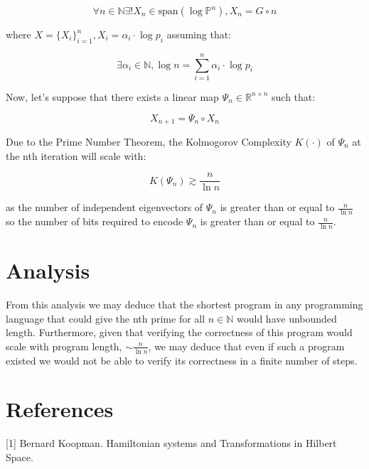 \documentclass{article}
\begin{document}
\begin{equation}
\forall n \in \mathbb{N} \exists! X_n \in \text{span}(\log \mathbb{P}^n), X_n = G \circ n
\end{equation}

where $X = \{X_i\}_{i=1}^n, X_i = \alpha_i \cdot \log p_i$ assuming that:

\begin{equation}
\exists \alpha_i \in \mathbb{N}, \log n = \sum_{i=1}^n \alpha_i \cdot \log p_i
\end{equation}

Now, let's suppose that there exists a linear map $\Psi_n \in \mathbb{R}^{n \times n}$ such that:

\begin{equation}
X_{n+1} = \Psi_n \circ X_n
\end{equation}

Due to the Prime Number Theorem, the Kolmogorov Complexity $K(\cdot)$ of $\Psi_n$ at the nth iteration will scale with:

\begin{equation}
K(\Psi_n) \gtrsim \frac{n}{\ln n}
\end{equation}

as the number of independent eigenvectors of $\Psi_n$ is greater than or equal to $\frac{n}{\ln n}$ so the number of bits required to encode $\Psi_n$ is greater than or equal to $\frac{n}{\ln n}$.

\newpage

\section{Analysis}

From this analysis we may deduce that the shortest program in any programming language that could give the nth prime for all $n \in \mathbb{N}$ would have unbounded length. Furthermore, given that verifying the correctness of this program would scale with program length, $ \sim \frac{n}{\ln n}$, we may deduce that even if such a program existed we would not be able to verify its correctness in a finite number of steps. 

\section*{References}

\small

[1] Bernard Koopman. Hamiltonian systems and Transformations in Hilbert Space.
\end{document}
